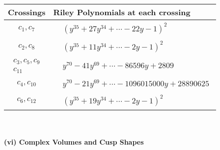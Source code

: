\documentclass[1p]{elsarticle_modified}
\theoremstyle{definition}
\begin{document}
\begin{tabular}{m{50pt}|m{274pt}}
Crossings & \hspace{64pt}Riley Polynomials at each crossing \\
\hline $$\begin{aligned}c_{1},c_{7}\end{aligned}$$&$\begin{aligned}
&(y^{35}+27 y^{34}+\cdots-22 y-1)^{2}
\end{aligned}$\\
\hline $$\begin{aligned}c_{2},c_{8}\end{aligned}$$&$\begin{aligned}
&(y^{35}+11 y^{34}+\cdots-2 y-1)^{2}
\end{aligned}$\\
\hline $$\begin{aligned}c_{3},c_{5},c_{9}\\c_{11}\end{aligned}$$&$\begin{aligned}
&y^{70}-41 y^{69}+\cdots-86596 y+2809
\end{aligned}$\\
\hline $$\begin{aligned}c_{4},c_{10}\end{aligned}$$&$\begin{aligned}
&y^{70}-21 y^{69}+\cdots-1096015000 y+28890625
\end{aligned}$\\
\hline $$\begin{aligned}c_{6},c_{12}\end{aligned}$$&$\begin{aligned}
&(y^{35}+19 y^{34}+\cdots-2 y-1)^{2}
\end{aligned}$\\
\hline
\end{tabular}\\~\\
\newpage\flushleft \textbf{(vi) Complex Volumes and Cusp Shapes}
\end{document}
